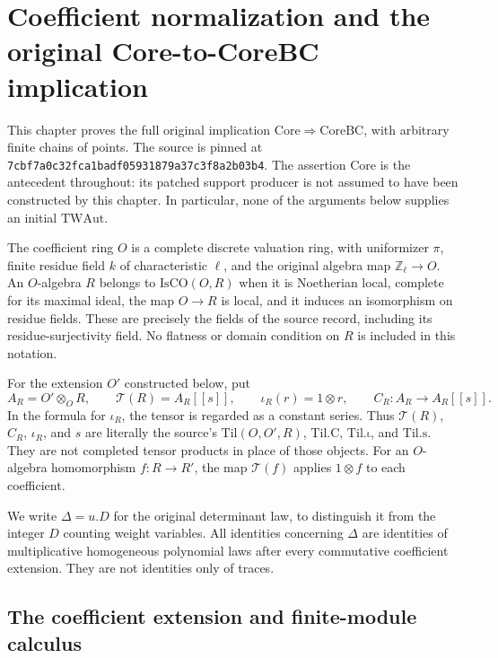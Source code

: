 \section{Coefficient normalization and the original Core-to-CoreBC implication}
\label{sec:bcn}

This chapter proves the full original implication
\(\mathrm{Core}\Rightarrow\mathrm{CoreBC}\), with arbitrary finite
chains of points.  The source is pinned at
\texttt{7cbf7a0c32fca1badf05931879a37c3f8a2b03b4}.
The assertion \(\mathrm{Core}\) is the antecedent throughout:
its patched support producer is not assumed to have been constructed
by this chapter.  In particular, none of the arguments below supplies
an initial \(\mathrm{TWAut}\).

The coefficient ring \(O\) is a complete discrete valuation ring,
with uniformizer \(\pi\), finite residue field \(k\) of characteristic
\(\ell\), and the original algebra map \(\mathbb Z_\ell\to O\).
An \(O\)-algebra \(R\) belongs to \(\mathrm{IsCO}(O,R)\) when it is
Noetherian local, complete for its maximal ideal, the map \(O\to R\)
is local, and it induces an isomorphism on residue fields.  These
are precisely the fields of the source record, including its
residue-surjectivity field.  No flatness or domain condition on
\(R\) is included in this notation.

For the extension \(O'\) constructed below, put
\[
 A_R=O'\otimes_O R,\qquad
 \mathscr T(R)=A_R[[s]],\qquad
 \iota_R(r)=1\otimes r,\qquad C_R:A_R\longrightarrow A_R[[s]].
 \tag{BCN.1}
\]
In the formula for \(\iota_R\), the tensor is regarded as a constant
series.  Thus \(\mathscr T(R)\), \(C_R\), \(\iota_R\), and \(s\) are
literally the source's \(\mathrm{Til}(O,O',R)\), \(\mathrm{Til.C}\),
\(\mathrm{Til.\iota}\), and \(\mathrm{Til.s}\).  They are not
completed tensor products in place of those objects.
For an \(O\)-algebra homomorphism \(f:R\to R'\), the map
\(\mathscr T(f)\) applies \(1\otimes f\) to each coefficient.

We write \(\Delta=u.D\) for the original determinant law, to
distinguish it from the integer \(D\) counting weight variables.
All identities concerning \(\Delta\) are identities of
multiplicative homogeneous polynomial laws after every commutative
coefficient extension.  They are not identities only of traces.

\subsection{The coefficient extension and finite-module calculus}

